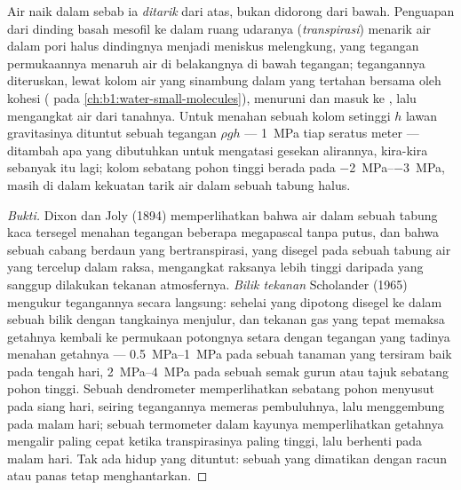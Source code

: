 \begin{theorem}\label{thm:b1:plant-transport:cohesiontension}
Air naik dalam  sebab ia \emph{ditarik} dari atas, bukan
didorong dari bawah. Penguapan dari dinding basah  mesofil 
ke dalam ruang udaranya (\emph{transpirasi}) menarik air dalam pori
halus dindingnya menjadi meniskus melengkung, yang tegangan
permukaannya menaruh air di belakangnya di bawah tegangan; tegangannya
diteruskan, lewat kolom air yang sinambung dalam  yang
tertahan bersama oleh kohesi ( pada
\cref{ch:b1:water-small-molecules}), menuruni  dan masuk ke
, lalu mengangkat air dari tanahnya. Untuk menahan sebuah kolom
setinggi $h$ lawan gravitasinya dituntut sebuah tegangan $\rho g h$ ---
\qty{1}{MPa} tiap seratus meter --- ditambah apa yang dibutuhkan untuk
mengatasi gesekan alirannya, kira-kira sebanyak itu lagi; kolom
sebatang pohon tinggi berada pada \qtyrange{-2}{-3}{MPa}, masih di
dalam kekuatan tarik air dalam sebuah tabung halus.
\end{theorem}
\begin{proof}[Bukti]
Dixon dan Joly (1894) memperlihatkan bahwa air dalam sebuah tabung
kaca tersegel menahan tegangan beberapa megapascal tanpa putus, dan
bahwa sebuah cabang berdaun yang bertranspirasi, yang disegel pada
sebuah tabung air yang tercelup dalam raksa, mengangkat raksanya lebih
tinggi daripada yang sanggup dilakukan tekanan atmosfernya.
\emph{Bilik tekanan} Scholander (1965) mengukur tegangannya secara
langsung: sehelai  yang dipotong disegel ke dalam sebuah bilik
dengan tangkainya menjulur, dan tekanan gas yang tepat memaksa
getahnya kembali ke permukaan potongnya setara dengan tegangan yang
tadinya menahan getahnya --- \qtyrange{0.5}{1}{MPa} pada sebuah
tanaman yang tersiram baik pada tengah hari, \qtyrange{2}{4}{MPa} pada
sebuah semak gurun atau tajuk sebatang pohon tinggi. Sebuah
dendrometer memperlihatkan  sebatang pohon menyusut pada siang
hari, seiring tegangannya memeras pembuluhnya, lalu menggembung pada
malam hari; sebuah termometer dalam kayunya memperlihatkan getahnya
mengalir paling cepat ketika transpirasinya paling tinggi, lalu
berhenti pada malam hari. Tak ada  hidup yang dituntut: sebuah
 yang dimatikan dengan racun atau panas tetap menghantarkan.
\end{proof}

